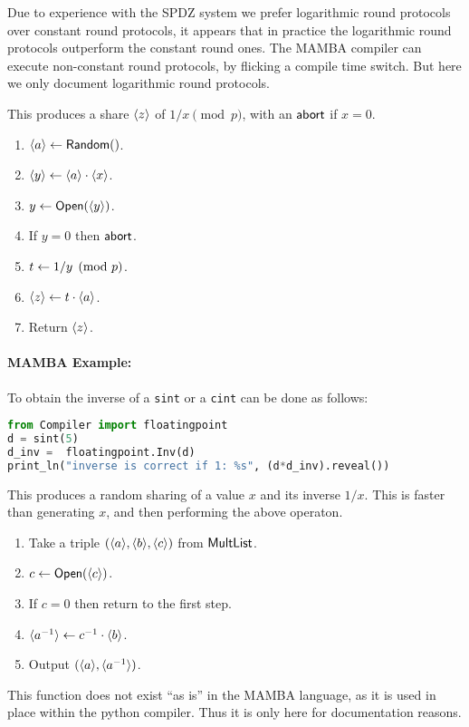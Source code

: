 Due to experience with the SPDZ system we prefer logarithmic
round protocols over constant round protocols, it appears that in
practice the logarithmic round protocols outperform the constant
round ones.
The MAMBA compiler can execute non-constant round protocols, by 
flicking a compile time switch. But here we only document
logarithmic round protocols.


This produces a share $\langle z \rangle$ of $1/x \pmod{p}$, with an
$\mathsf{abort}$ if $x=0$.
\begin{enumerate}
\item $\langle a \rangle \leftarrow \mathsf{Random}()$.
\item $\langle y \rangle \leftarrow \langle a \rangle \cdot \langle x \rangle$.
\item $y \leftarrow {\mathsf{Open}}(\langle y \rangle)$.
\item If $y=0$ then $\mathsf{abort}$.
\item $t \leftarrow 1/y \pmod{p}$.
\item $\langle z \rangle \leftarrow t \cdot \langle a \rangle$.
\item Return $\langle z \rangle$.
\end{enumerate}
\paragraph{MAMBA Example:} To obtain the inverse of a \verb|sint| or a \verb|cint| can be done as follows: 
\begin{lstlisting}[language={python}]
from Compiler import floatingpoint
d = sint(5)
d_inv =  floatingpoint.Inv(d)
print_ln("inverse is correct if 1: %s", (d*d_inv).reveal())
\end{lstlisting}

This produces a random sharing of a value $x$ and its inverse $1/x$.
This is faster than generating $x$, and then performing the above operaton.
\begin{enumerate}
\item Take a triple $(\langle a \rangle,\langle b \rangle,\langle c \rangle)$ from $\mathsf{MultList}$.
\item $c \leftarrow {\mathsf{Open}}(\langle c \rangle)$.
\item If $c=0$ then return to the first step.
\item $\langle a^{-1} \rangle \leftarrow c^{-1} \cdot \langle b \rangle$.
\item Output $(\langle a \rangle,\langle a^{-1} \rangle)$.
\end{enumerate}
This function does not exist ``as is'' in the MAMBA language, as it
is used in place within the python compiler. Thus it is only here
for documentation reasons.

